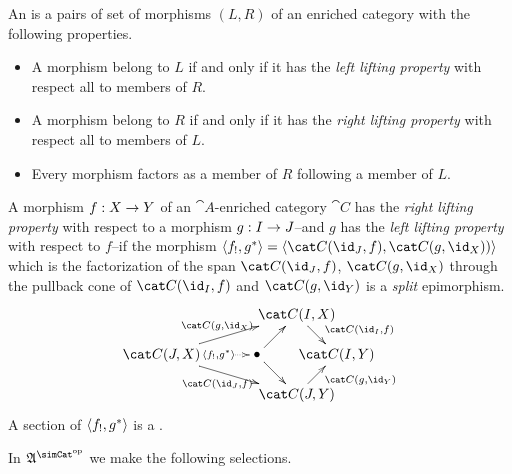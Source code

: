 \documentclass[csh.tex]{subfiles}
\begin{document}
\begin{definition}
An  is a pairs of set of morphisms $(L,R)$ of an enriched category with the following properties.
\begin{itemize}
\item A morphism belong to $L$ if and only if it has the \emph{left lifting property} with respect all to members of $R$.
\item A morphism belong to $R$ if and only if it has the \emph{right lifting property} with respect all to members of $L$.
\item Every morphism factors as a member of $R$ following a member of $L$.
\end{itemize}

A morphism $f: X\to Y$ of an $\cat A$-enriched category $\cat C$ has the \emph{right lifting property} with respect to a morphism $g: I\to J$--and $g$ has the \emph{left lifting property} with respect to $f$--if the morphism $\tuplet{f_!,g\ri} = \tuplet{\cat C(\id_J,f),\cat C(g,\id_X))}$ which is the factorization of the span $\cat C(\id_J,f)$, $\cat C(g,\id_X)$ through the pullback cone of $\cat C(\id_I,f)$ and $\cat C(g,\id_Y)$ is a \emph{split} epimorphism.
\[\xy
(34,20)*+{\cat C(I,X)}="top",(0,10)*+{\cat C(J,X)}="left",(24,10)*+{\bullet}="middle",(44,10)*+{\cat C(I,Y)}="right",(34,0)*+{\cat C(J,Y)}="bottom"
\ar^{\cat C(g,\id_X)} "left";"top" \ar@{.>}|(.6){\tuplet{f_!,g\ri}} "left";"middle" \ar_{\cat C(\id_J,f)} "left";"bottom" \ar "middle";"bottom"
\ar "middle";"top" \ar^(.6){\cat C(\id_I,f)} "top";"right" \ar_(.6){\cat C(g,\id_Y)} "bottom";"right"
\endxy\]
A section of $\left\langle f_!,g^* \right\rangle$ is a .
\end{definition}

In $\ambient\s$ we make the following selections. 
\end{document}
